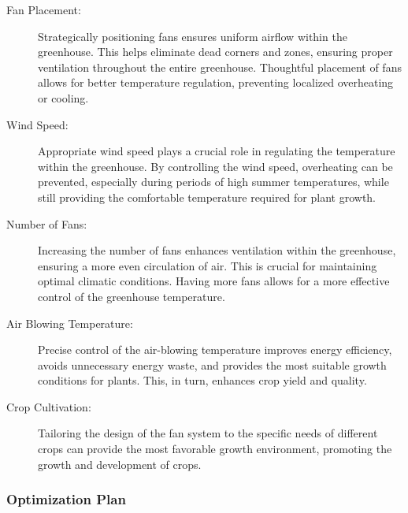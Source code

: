 \documentclass{apmcmthesis}
\begin{document}
{\begin{description}
	\item[Fan Placement:] Strategically positioning fans ensures uniform airflow within the greenhouse. This helps eliminate dead corners and zones, ensuring proper ventilation throughout the entire greenhouse. Thoughtful placement of fans allows for better temperature regulation, preventing localized overheating or cooling.
    \item[Wind Speed:]Appropriate wind speed plays a crucial role in regulating the temperature within the greenhouse. By controlling the wind speed, overheating can be prevented, especially during periods of high summer temperatures, while still providing the comfortable temperature required for plant growth.%
    
    \item[Number of Fans:]Increasing the number of fans enhances ventilation within the greenhouse, ensuring a more even circulation of air. This is crucial for maintaining optimal climatic conditions. Having more fans allows for a more effective control of the greenhouse temperature.%
    \item[Air Blowing Temperature:] Precise control of the air-blowing temperature improves energy efficiency, avoids unnecessary energy waste, and provides the most suitable growth conditions for plants. This, in turn, enhances crop yield and quality.
    \item[Crop Cultivation:] Tailoring the design of the fan system to the specific needs of different crops can provide the most favorable growth environment, promoting the growth and development of crops. %
\end{description}

\subsubsection{Optimization Plan}

}
\end{document}
